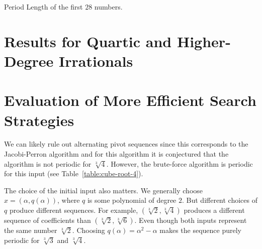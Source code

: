 \begin{table}[t]
  \caption{Period Length of the first $28$ numbers.}
  \centering
  
\end{table}

\section{Results for Quartic and Higher-Degree Irrationals}

\section{Evaluation of More Efficient Search Strategies}

We can likely rule out alternating pivot sequences since this corresponds to
the Jacobi-Perron algorithm and for this algorithm it is conjectured
\cite{Karpenkov21} that the algorithm is not periodic for $\sqrt[3]{4}$.
However, the brute-force algorithm is periodic for this input (see Table~\ref{table:cube-root-4}).

The choice of the initial input also matters.
We generally choose $x = (α, q(α))$, where $q$ is some polynomial of degree $2$.
But different choices of $q$ produce different sequences.
For example, $(\sqrt[3]{2}, \sqrt[3]{4})$ produces a different sequence of coefficients than $(\sqrt[3]{2}, \sqrt[3]{6})$.
Even though both inputs represent the same number $\sqrt[3]{2}$.
Choosing $q(α) = α^2 - α$ makes the sequence purely periodic for $\sqrt[3]{3}$ and $\sqrt[3]{4}$.
